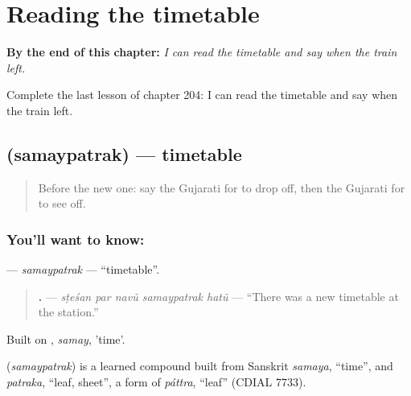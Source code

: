 
\chapter{Reading the timetable}
\label{ch:gu-reading-the-timetable}

\begin{chapteropening}
\textbf{By the end of this chapter:} \emph{I can read the timetable and say when the train left.}

Complete the last lesson of chapter 204: I can read the timetable and say when the train left.
\end{chapteropening}

\section[\texorpdfstring{\gu{સમયપત્રક} (samaypatrak)}{સમયપત્રક (samaypatrak)}]{ (samaypatrak) — timetable}

\label{lesson:GU-C204-samaypatrak}



\begin{quote}
Before the new one: say the Gujarati for to drop off, then the Gujarati for to see off.
\end{quote}

\subsection*{You'll want to know: }
\textbf{} — \emph{samaypatrak} — \textquotedblleft{}timetable\textquotedblright{}.

\begin{quote}
\textbf{    .} — \emph{sṭeśan par navũ samaypatrak hatũ} — \textquotedblleft{}There was a new timetable at the station.\textquotedblright{}
\end{quote}

Built on \textbf{}, \emph{samay}, 'time'.

\begin{cousinweb}
\textbf{} (\emph{samaypatrak}) is a learned compound built from Sanskrit \emph{samaya}, \textquotedblleft{}time\textquotedblright{}, and \emph{patraka}, \textquotedblleft{}leaf, sheet\textquotedblright{}, a form of \emph{páttra}, \textquotedblleft{}leaf\textquotedblright{} (CDIAL 7733).
\end{cousinweb}

